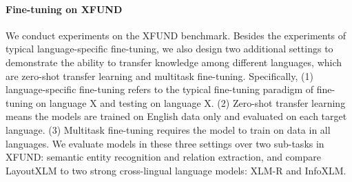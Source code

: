 \documentclass[11pt]{article}
\newcommand{\task}{\textsc{XFUND}\xspace}
\begin{document}
\paragraph{Fine-tuning on \task}
We conduct experiments on the XFUND benchmark. Besides the experiments of typical language-specific fine-tuning, we also design two additional settings to demonstrate the ability to transfer knowledge among different languages, which are zero-shot transfer learning and multitask fine-tuning. Specifically, (1) language-specific fine-tuning refers to the typical fine-tuning paradigm of fine-tuning on language X and testing on language X. (2) Zero-shot transfer learning means the models are trained on English data only and evaluated on each target language. (3) Multitask fine-tuning requires the model to train on data in all languages. We evaluate models in these three settings over two sub-tasks in \task: semantic entity recognition and relation extraction, and compare LayoutXLM to two strong cross-lingual language models: XLM-R and InfoXLM. 
\end{document}
